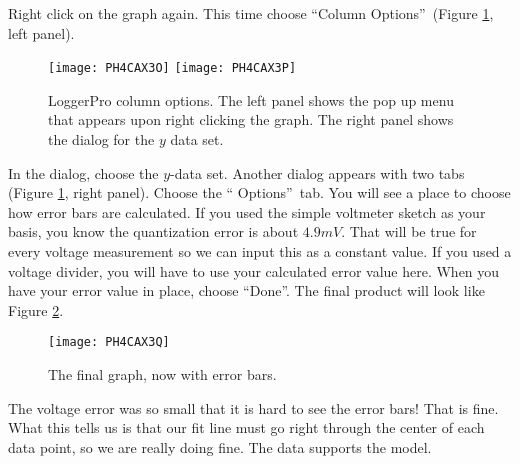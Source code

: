 Right click on the graph again. This time choose
\textquotedblleft Column Options\textquotedblright\ 
(Figure \ref{fig:colopts}, left panel).
\begin{figure}[tbp!]
	\centering
\texttt{[image: PH4CAX3O]}
\texttt{[image: PH4CAX3P]}
	\caption[LoggerPro column options]{LoggerPro column options. The left
	panel shows the pop up menu that appears upon right clicking the 
	graph. The right panel shows the dialog for the $y$ data set.}
	\label{fig:colopts}
\end{figure}
In the dialog, choose the $y$-data set.
Another dialog appears with two tabs
(Figure \ref{fig:colopts}, right panel). Choose the \textquotedblleft
Options\textquotedblright\ tab. 
You will see a place to choose how error bars are calculated. If you used
the simple voltmeter sketch as your basis, you know the quantization error
is about $4.9\unit{mV}.$ That will be true for every voltage measurement so
we can input this as a constant value. If you used a voltage divider, you
will have to use your calculated error value here. When you have your error
value in place, choose \textquotedblleft Done\textquotedblright. The final
product will look like Figure \ref{fig:rc_done}.
\begin{figure}[htbp!]
	\centering
\texttt{[image: PH4CAX3Q]}
	\caption{The final graph, now with error bars.}
	\label{fig:rc_done}
\end{figure}

The voltage error was so small that it is hard to see the error bars! That
is fine. What this tells us is that our fit line must go right through the
center of each data point, so we are really doing fine. The
data supports the model.


